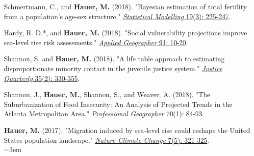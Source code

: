 \begin{etaremune}
{ \item Schmertmann, C., and \textbf{Hauer, M.} (2018). "Bayesian estimation of total fertility from a population's age-sex structure." \href{https://doi.org/10.1177/1471082X18801450 }{\textit{Statistical Modelling} 19(3): 225-247}.
 
\item Hardy, R. D.*, and \textbf{Hauer, M.} (2018). "Social vulnerability projections improve sea-level rise risk assessments." \href{https://www.sciencedirect.com/science/article/pii/S0143622817309189}{\textit{Applied Geographer} 91: 10-20}.
 
\item Shannon, S. and \textbf{Hauer, M.} (2018). "A life table approach to estimating disproportionate minority contact in the juvenile justice system." \href{http://www.tandfonline.com/doi/full/10.1080/07418825.2017.1315163}{\textit{Justice Quarterly} 35(2): 330-355}.

\item Shannon, J., \textbf{Hauer, M.}, Shannon, S., and Weaver, A. (2018). "The Suburbanization of Food Insecurity: An Analysis of Projected     Trends in the Atlanta Metropolitan Area." \href{http://www.tandfonline.com/doi/full/10.1080/00330124.2017.1325751}{\textit{Professional Geographer} 70(1): 84-93}.

\item \textbf{Hauer, M.} (2017). "Migration induced by sea-level rise could reshape the United States population landscape." \href{http://dx.doi.org/10.1038/nclimate3271}{\textit{Nature Climate Change} 7(5): 321-325}.\\
        \hangindent=3em \\
       
}
\end{etaremune}
